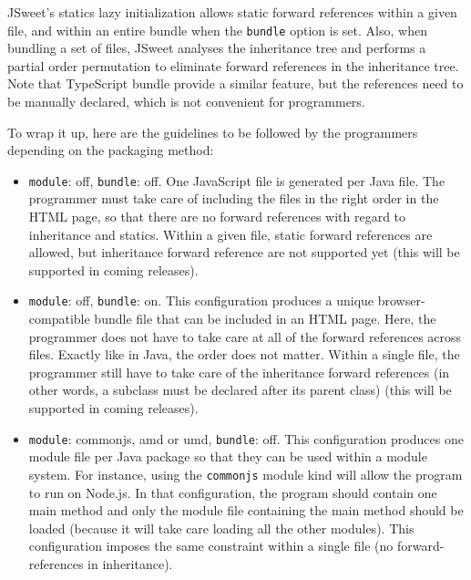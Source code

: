 \documentclass[a4paper]{report}
\begin{document}
JSweet's statics lazy initialization allows static forward references within a given file, and within an entire bundle when the \texttt{bundle} option is set. Also, when bundling a set of files, JSweet analyses the inheritance tree and performs a partial order permutation to eliminate forward references in the inheritance tree. Note that TypeScript bundle provide a similar feature, but the references need to be manually declared, which is not convenient for programmers.

To wrap it up, here are the guidelines to be followed by the programmers depending on the packaging method:

\begin{itemize}
\item \texttt{module}: off, \texttt{bundle}: off. One JavaScript file is generated per Java file. The programmer must take care of including the files in the right order in the HTML page, so that there are no forward references with regard to inheritance and statics. Within a given file, static forward references are allowed, but inheritance forward reference are not supported yet (this will be supported in coming releases). 
\item \texttt{module}: off, \texttt{bundle}: on. This configuration produces a unique browser-compatible bundle file that can be included in an HTML page. Here, the programmer does not have to take care at all of the forward references across files. Exactly like in Java, the order does not matter. Within a single file, the programmer still have to take care of the inheritance forward references (in other words, a subclass must be declared after its parent class) (this will be supported in coming releases).
\item \texttt{module}: commonjs, amd or umd, \texttt{bundle}: off. This configuration produces one module file per Java package so that they can be used within a module system. For instance, using the \texttt{commonjs} module kind will allow the program to run on Node.js. In that configuration, the program should contain one main method and only the module file containing the main method should be loaded (because it will take care loading all the other modules). This configuration imposes the same constraint within a single file (no forward-references in inheritance).
\end{itemize}
        
\end{document}
